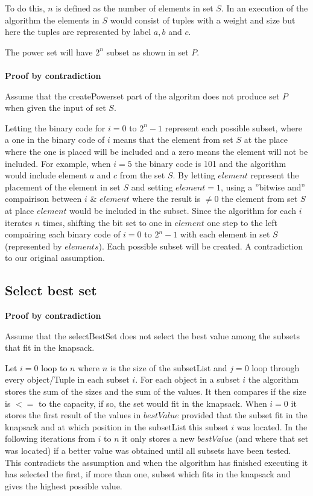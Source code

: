 \documentclass{inc/mas}
\begin{document}
To do this, $n$ is defined as the number of elements in set $S$. In an execution of the algorithm the elements in $S$ would consist of tuples with a weight and size but here the tuples are represented by label $a,b$ and $c$.

The power set will have $2^n$ subset as shown in set $P$.\\\\

\textbf{Proof by contradiction}

Assume that the createPowerset part of the algoritm does not produce set $P$ when given the input of set $S$.

Letting the binary code for $i = 0$ to $2^n-1$ represent each possible subset, where a one in the binary code of $i$ means that the element from set $S$ at the place where the one is placed will be included and a zero means the element will not be included. For example, when $i = 5$ the binary code is 101 and the algorithm would include element $a$ and $c$ from the set $S$. By letting $element$ represent the placement of the element in set $S$ and setting $element = 1$, using a ''bitwise and'' compairison between $i$ \& $element$ where the result is $\neq0$ the element from set $S$ at place $element$ would be included in the subset. Since the algorithm for each $i$ iterates $n$ times, shifting the bit set to one in $element$ one step to the left compairing each binary code of $i = 0$ to $2^n-1$ with each element in set $S$ (represented by $elements$). Each possible subset will be created. A contradiction to our original assumption.

\subsection{Select best set}

\textbf{Proof by contradiction}

Assume that the selectBestSet does not select the best value among the subsets that fit in the knapsack.

Let $i = 0$ loop to $n$ where $n$ is the size of the subsetList and $j = 0$ loop through every object/Tuple in each subset $i$. For each object in a subset $i$ the algorithm stores the sum of the sizes and the sum of the values. It then compares if the size is $<=$ to the capacity, if so, the set would fit in the knapsack. When $i = 0$ it stores the first result of the values in $bestValue$ provided that the subset fit in the knapsack and at which position in the subsetList this subset $i$ was located. In the following iterations from $i$ to $n$ it only stores a new $bestValue$ (and where that set was located) if a better value was obtained until all subsets have been tested. This contradicts the assumption and when the algorithm has finished executing it has selected the first, if more than one, subset which fits in the knapsack and gives the highest possible value.
\end{document}
